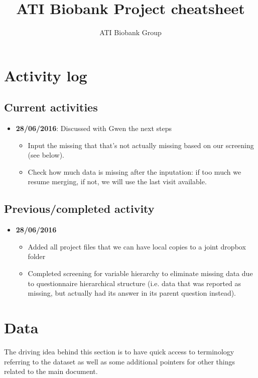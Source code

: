 \documentclass{article}
\begin{document}
\title{ATI Biobank Project cheatsheet}

\author{ATI Biobank Group}

\maketitle

\section{Activity log}

\subsection{Current activities}
\begin{itemize}
\item {\bf 28/06/2016}: Discussed with Gwen the next steps
  \begin{itemize}
  \item Input the missing that that's not actually missing based on our screening (see below).
  \item Check how much data is missing after the inputation: if too much we resume merging, if not, we will use the last visit available.
  \end{itemize}
\end{itemize}

\subsection{Previous/completed activity}
\begin{itemize}
\item {\bf 28/06/2016}
  \begin{itemize}
  \item Added all project files that we can have local copies to a joint dropbox folder
  \item Completed screening for variable hierarchy to eliminate missing data due to questionnaire hierarchical structure (i.e. data that was reported as missing, but actually had its answer in its parent question instead).
  \end{itemize}
\end{itemize}

\section{Data\label{sec:data}}
The driving idea behind this section is to have quick access to terminology referring to the dataset as well as some additional pointers for other things related to the main document.
\end{document}

